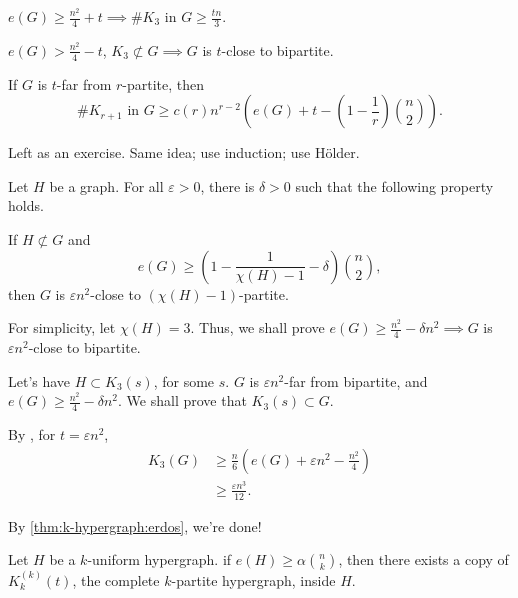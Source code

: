 \begin{cor}
	$e(G) \ge \frac{n^2}{4} + t \implies \# K_3 \text{ in } G \ge \frac{tn}{3}$.
\end{cor}

\begin{cor}
	$e(G) > \frac{n^2}{4} - t$, $K_3 \not\subset G \implies G$ is $t$-close to bipartite.
\end{cor}

\begin{thm}
	If $G$ is $t$-far from $r$-partite, then
	\[
		\# K_{r+1}\text{ in } G \ge c(r) n^{r-2} \left( e(G) + t - \left(1 - \frac{1}{r}\right)\binom{n}{2} \right).
	\]
\end{thm}

\begin{dem}
	Left as an exercise. Same idea; use induction; use H\"older.
\end{dem}

\begin{thm}
	Let $H$ be a graph. For all $\varepsilon > 0$, there is $\delta > 0$ such that the following property holds. 

	If $H \not\subset G$ and \[ e(G) \ge \left(1 - \frac{1}{\chi(H) - 1} - \delta \right) \binom{n}{2},\] then $G$ is $\varepsilon n^2$-close to $(\chi(H) - 1)$-partite.
\end{thm}

\begin{sk}
	For simplicity, let $\chi(H) = 3$. Thus, we shall prove $e(G) \ge \frac{n^2}{4} - \delta n^2 \implies G$ is $\varepsilon n^2$-close to bipartite.

	Let's have $H \subset K_3(s)$, for some $s$. $G$ is $\varepsilon n^2$-far from bipartite, and $e(G) \ge \frac{n^2}{4} - \delta n^2$. We shall prove that $K_3(s) \subset G$.

	By , for $t = \varepsilon n^2$, 
	\begin{align*}
		K_3(G) &\ge \frac{n}{6} \left(e(G) + \varepsilon n^2 - \frac{n^2}{4} \right)\\
			   &\ge \frac{\varepsilon n^3}{12}.
	\end{align*}

	By \cref{thm:k-hypergraph:erdos}, we're done!

\end{sk}

\begin{thm}[Erd\H{o}s]\label{thm:k-hypergraph:erdos}
	Let $H$ be a $k$-uniform hypergraph. if $e(H) \ge \alpha \binom{n}{k}$, then there exists a copy of $K^{(k)}_{k}(t)$, the complete $k$-partite hypergraph, inside $H$.
\end{thm}

